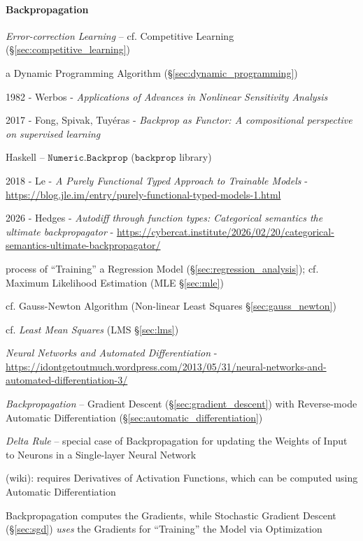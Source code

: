 \paragraph{Backpropagation}\label{sec:backpropagation}\hfill

\emph{Error-correction Learning} -- cf. Competitive Learning
(\S\ref{sec:competitive_learning})

a Dynamic Programming Algorithm (\S\ref{sec:dynamic_programming})

1982 - Werbos -
\emph{Applications of Advances in Nonlinear Sensitivity Analysis}

2017 - Fong, Spivak, Tuy\'eras - \emph{Backprop as Functor: A compositional
  perspective on supervised learning}

Haskell -- $\mathtt{Numeric.Backprop}$ ($\mathtt{backprop}$ library)

2018 - Le - \emph{A Purely Functional Typed Approach to Trainable Models} -
\url{https://blog.jle.im/entry/purely-functional-typed-models-1.html}

2026 - Hedges - \emph{Autodiff through function types: Categorical semantics the
ultimate backpropagator} -
\url{https://cybercat.institute/2026/02/20/categorical-semantics-ultimate-backpropagator/}

process of ``Training'' a Regression Model (\S\ref{sec:regression_analysis});
cf. Maximum Likelihood Estimation (MLE \S\ref{sec:mle})

cf. Gauss-Newton Algorithm (Non-linear Least Squares \S\ref{sec:gauss_newton})

cf. \emph{Least Mean Squares} (LMS \S\ref{sec:lms})

\emph{Neural Networks and Automated Differentiation} -
\url{https://idontgetoutmuch.wordpress.com/2013/05/31/neural-networks-and-automated-differentiation-3/}

\emph{Backpropagation} -- Gradient Descent (\S\ref{sec:gradient_descent}) with
Reverse-mode Automatic Differentiation (\S\ref{sec:automatic_differentiation})

\emph{Delta Rule} -- special case of Backpropagation for updating the Weights of
Input to Neurons in a Single-layer Neural Network

(wiki): requires Derivatives of Activation Functions, which can be computed
using Automatic Differentiation

Backpropagation computes the Gradients, while Stochastic Gradient Descent
(\S\ref{sec:sgd}) \emph{uses} the Gradients for ``Training'' the Model via
Optimization

